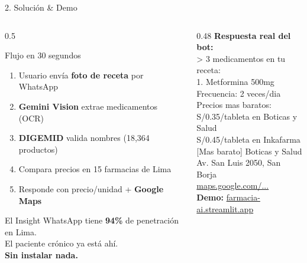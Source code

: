 \documentclass[aspectratio=169,11pt]{beamer}
\begin{document}
\begin{frame}{2. Soluci\'on \& Demo}

\begin{columns}[T]
\begin{column}{0.5\textwidth}
\begin{block}{Flujo en 30 segundos}
\small
\begin{enumerate}
  \item Usuario env\'ia \textbf{foto de receta} por WhatsApp
  \item \textbf{Gemini Vision} extrae medicamentos (OCR)
  \item \textbf{DIGEMID} valida nombres (18{,}364 productos)
  \item Compara precios en 15 farmacias de Lima
  \item Responde con precio/unidad + \textbf{Google Maps}
\end{enumerate}
\end{block}
\bigskip
\begin{block}{El Insight}
\small
WhatsApp tiene \textbf{94\%} de penetraci\'on en Lima.\\
El paciente cr\'onico ya est\'a ah\'i.\\
\textbf{Sin instalar nada.}
\end{block}
\end{column}
\begin{column}{0.48\textwidth}
\textbf{Respuesta real del bot:}\\[0.4em]
\small\ttfamily
> 3 medicamentos en tu receta:\\[0.2em]
1. Metformina 500mg\\
\phantom{x}Frecuencia: 2 veces/dia\\[0.2em]
Precios mas baratos:\\
S/0.35/tableta en Boticas y Salud\\
S/0.45/tableta en Inkafarma\\[0.2em]
[Mas barato] Boticas y Salud\\
Av. San Luis 2050, San Borja\\
\url{maps.google.com/...}\\[0.4em]
\rmfamily\small
\textbf{Demo:} \url{farmacia-ai.streamlit.app}
\end{column}
\end{columns}
\end{frame}
\end{document}
